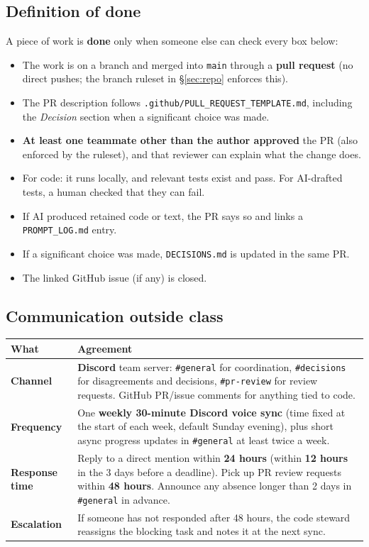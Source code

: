 \documentclass[11pt,a4paper]{article}
\newcommand{\code}[1]{\texttt{#1}}
\begin{document}
\subsection{Definition of done}

A piece of work is \textbf{done} only when someone else can check every box below:

\begin{itemize}[label=$\square$]
  \item The work is on a branch and merged into \code{main} through a \textbf{pull request} (no direct pushes; the branch ruleset in \S\ref{sec:repo} enforces this).
  \item The PR description follows \code{.github/PULL\_REQUEST\_TEMPLATE.md}, including the \emph{Decision} section when a significant choice was made.
  \item \textbf{At least one teammate other than the author approved} the PR (also enforced by the ruleset), and that reviewer can explain what the change does.
  \item For code: it runs locally, and relevant tests exist and pass. For AI-drafted tests, a human checked that they can fail.
  \item If AI produced retained code or text, the PR says so and links a \code{PROMPT\_LOG.md} entry.
  \item If a significant choice was made, \code{DECISIONS.md} is updated in the same PR.
  \item The linked GitHub issue (if any) is closed.
\end{itemize}

\subsection{Communication outside class}

\begin{tabularx}{\linewidth}{@{}>{\bfseries}p{2.6cm}L@{}}
\toprule
What & Agreement\\
\midrule
Channel & \textbf{Discord} team server: \code{\#general} for coordination, \code{\#decisions} for disagreements and decisions, \code{\#pr-review} for review requests. GitHub PR/issue comments for anything tied to code.\\
Frequency & One \textbf{weekly 30-minute Discord voice sync} (time fixed at the start of each week, default Sunday evening), plus short async progress updates in \code{\#general} at least twice a week.\\
Response time & Reply to a direct mention within \textbf{24 hours} (within \textbf{12 hours} in the 3 days before a deadline). Pick up PR review requests within \textbf{48 hours}. Announce any absence longer than 2 days in \code{\#general} in advance.\\
Escalation & If someone has not responded after 48 hours, the code steward reassigns the blocking task and notes it at the next sync.\\
\bottomrule
\end{tabularx}
\end{document}
